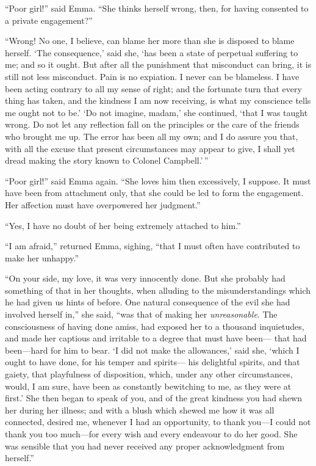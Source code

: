 ``Poor girl!'' said Emma.  ``She thinks herself wrong, then, for having
consented to a private engagement?''

``Wrong!  No one, I believe, can blame her more than she is disposed
to blame herself.  `The consequence,' said she, `has been a state
of perpetual suffering to me; and so it ought.  But after all the
punishment that misconduct can bring, it is still not less misconduct.
Pain is no expiation.  I never can be blameless.  I have been acting
contrary to all my sense of right; and the fortunate turn that every
thing has taken, and the kindness I am now receiving, is what my
conscience tells me ought not to be.'  `Do not imagine, madam,'
she continued, `that I was taught wrong.  Do not let any reflection
fall on the principles or the care of the friends who brought
me up.  The error has been all my own; and I do assure you that,
with all the excuse that present circumstances may appear to give,
I shall yet dread making the story known to Colonel Campbell.'\,''

``Poor girl!'' said Emma again.  ``She loves him then excessively,
I suppose.  It must have been from attachment only, that she could
be led to form the engagement.  Her affection must have overpowered
her judgment.''

``Yes, I have no doubt of her being extremely attached to him.''

``I am afraid,'' returned Emma, sighing, ``that I must often have
contributed to make her unhappy.''

``On your side, my love, it was very innocently done.  But she
probably had something of that in her thoughts, when alluding
to the misunderstandings which he had given us hints of before.
One natural consequence of the evil she had involved herself in,''
she said, ``was that of making her \emph{unreasonable}.  The consciousness
of having done amiss, had exposed her to a thousand inquietudes,
and made her captious and irritable to a degree that must have been---%
that had been---hard for him to bear.  `I did not make the allowances,'
said she, `which I ought to have done, for his temper and spirits---%
his delightful spirits, and that gaiety, that playfulness
of disposition, which, under any other circumstances, would, I am sure,
have been as constantly bewitching to me, as they were at first.'
She then began to speak of you, and of the great kindness you
had shewn her during her illness; and with a blush which shewed me
how it was all connected, desired me, whenever I had an opportunity,
to thank you---I could not thank you too much---for every wish and
every endeavour to do her good.  She was sensible that you had never
received any proper acknowledgment from herself.''

